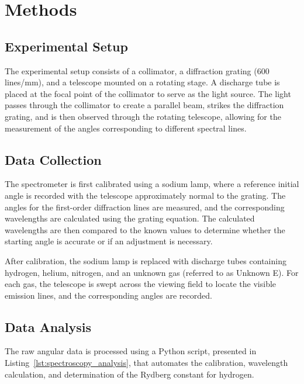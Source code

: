 \documentclass[11pt]{article}
\begin{document}
    \section{Methods}\label{sec:methods}

        \subsection*{Experimental Setup}
        The experimental setup consists of a collimator, a diffraction
        grating (600 lines/mm), and a telescope mounted on a rotating stage.
        A discharge tube is placed at the focal point of the collimator to
        serve as the light source.
        The light passes through the collimator to create a parallel beam,
        strikes the diffraction grating, and is then observed through the
        rotating telescope, allowing for the measurement of the angles
        corresponding to different spectral lines.

        \subsection*{Data Collection}
        The spectrometer is first calibrated using a sodium lamp, where
        a reference initial angle is recorded with the telescope approximately
        normal to the grating.
        The angles for the first-order diffraction lines are measured, and the
        corresponding wavelengths are calculated using the grating equation.
        The calculated wavelengths are then compared to the known values to
        determine whether the starting angle is accurate or if an adjustment
        is necessary.

        After calibration, the sodium lamp is replaced with discharge tubes
        containing hydrogen, helium, nitrogen, and an unknown gas (referred to
        as Unknown E).
        For each gas, the telescope is swept across the viewing field to
        locate the visible emission lines, and the corresponding angles are
        recorded.

        \subsection*{Data Analysis}
        The raw angular data is processed using a Python
        script, presented in Listing~\ref{lst:spectroscopy_analysis}, that
        automates the calibration, wavelength calculation, and determination
        of the Rydberg constant for hydrogen.
\end{document}

